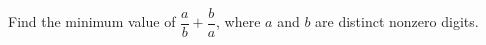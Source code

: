 Find the minimum value of $\dfrac{a}{b}+\dfrac{b}{a}$, where $a$ and $b$ are distinct nonzero digits.

